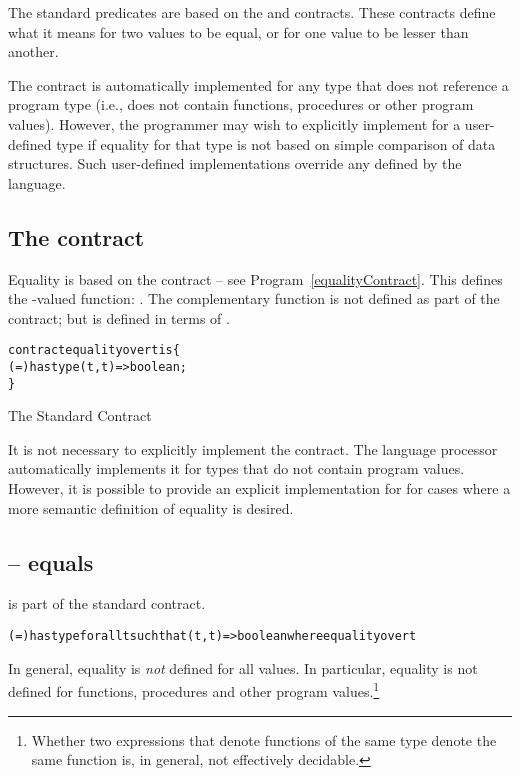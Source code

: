 The standard predicates are based on the  and  contracts. These contracts define what it means for two values to be equal, or for one value to be lesser than another.

The  contract is automatically implemented for any type that does not reference a program type (i.e., does not contain functions, procedures or other program values). However, the programmer may wish to explicitly implement  for a user-defined type if equality for that type is not based on simple comparison of data structures. Such user-defined implementations override any defined by the language.

\subsection{The  contract}
\label{equalityPredicates}
Equality is based on the  contract -- see Program~\vref{equalityContract}. This defines the -valued function: \q{=}. The complementary function \q{!=} is not defined as part of the  contract; but is defined in terms of \q{=}.

\begin{program}
\begin{alltt}
contract equality over t is \{
  (=) has type (t,t)=>boolean;
\}
\end{alltt}
\caption{The Standard  Contract\label{equalityContract}}
\end{program}

It is not necessary to explicitly implement the  contract. The language processor automatically implements it for types that do not contain program values. However, it is possible to provide an explicit implementation for  for cases where a more semantic definition of equality is desired.

\subsection{\q{=} -- equals}
\label{equalsPredicate}
\q{=} is part of the standard  contract.
\begin{alltt}
(=) has type for all t such that (t,t) => boolean where equality over t
\end{alltt}
In general, equality is \emph{not} defined for all values. In particular, equality is not defined for functions, procedures and other program values.\footnote{Whether two expressions that denote functions of the same type denote the same function is, in general, not effectively decidable.}

